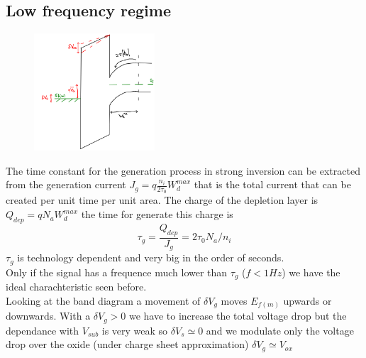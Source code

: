 \subsection{Low frequency regime}
\begin{figure}
\includegraphics[width=0.4\textwidth]{lfbd.png}
\end{figure}
The time constant for the generation process in strong inversion can be extracted from the generation current $J_g=q\frac{n_i}{2\tau_0}W_d^{max}$ that is the total current that can be created per unit time per unit area. The charge of the depletion layer is $Q_{dep}=qN_aW_d^{max}$ the time for generate this charge is 
\begin{equation}
\tau_g=\frac{Q_{dep}}{J_g}=2\tau_0N_a/n_i
\end{equation}
$\tau_g$ is technology dependent and very big in the order of seconds.\\
Only if the signal has a frequence much lower than $\tau_g$ ($f<1Hz$) we have the ideal charachteristic seen before.\\
Looking at the band diagram a movement of $\delta V_g$ moves $E_{f(m)}$ upwards or downwards. With a $\delta V_g>0$ we have to increase the total voltage drop but the dependance with $V_{sub}$ is very weak so $\delta V_s\simeq 0$ and we modulate only the voltage drop over the oxide (under charge sheet approximation) $\delta V_g\simeq V_{ox}$

